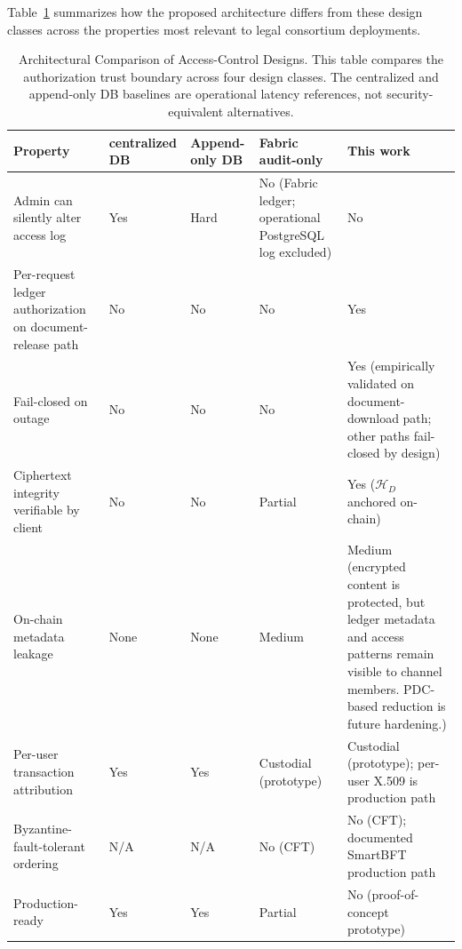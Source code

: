 \documentclass{ieeeaccess}
\begin{document}
Table~\ref{tab:arch_comparison} summarizes how the proposed
architecture differs from these design classes across the
properties most relevant to legal consortium deployments.

\begin{table}[!t]
\centering
\caption{Architectural Comparison of Access-Control Designs.
This table compares the authorization trust boundary across four
design classes. The centralized and append-only DB baselines are operational latency references, not security-equivalent alternatives.}
\label{tab:arch_comparison}
\renewcommand{\arraystretch}{1.18}
\setlength{\tabcolsep}{4pt}
\footnotesize
\begin{tabularx}{\textwidth}{|>{\RaggedRight\arraybackslash}p{3.05cm}|>{\RaggedRight\arraybackslash}X|>{\RaggedRight\arraybackslash}X|>{\RaggedRight\arraybackslash}X|>{\RaggedRight\arraybackslash}X|}
\hline
\textbf{Property} &
\textbf{centralized DB} &
\textbf{Append-only DB} &
\textbf{Fabric audit-only} &
\textbf{This work} \\
\hline
Admin can silently alter access log &
Yes &
Hard &
No (Fabric ledger; operational PostgreSQL log excluded) &
No \\
\hline
Per-request ledger authorization on document-release path &
No &
No &
No &
Yes \\
\hline
Fail-closed on outage &
No &
No &
No &
Yes (empirically validated on document-download path; other paths fail-closed by design) \\
\hline
Ciphertext integrity verifiable by client &
No &
No &
Partial &
Yes ($\mathcal{H}_D$ anchored on-chain) \\
\hline
On-chain metadata leakage &
None &
None &
Medium &
Medium (encrypted content is protected, but ledger metadata and access patterns
remain visible to channel members. PDC-based reduction is future hardening.) \\
\hline
Per-user transaction attribution &
Yes &
Yes &
Custodial (prototype) &
Custodial (prototype); per-user X.509 is production path \\
\hline
Byzantine-fault-tolerant ordering &
N/A &
N/A &
No (CFT) &
No (CFT); documented SmartBFT production path~\cite{fabricWhatsNew3x,fabricOrderingServiceLatest} \\
\hline
Production-ready &
Yes &
Yes &
Partial &
No (proof-of-concept prototype) \\
\hline
\end{tabularx}
\end{table}
\end{document}
